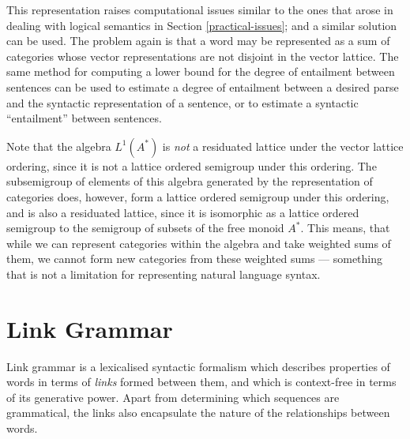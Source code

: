 This representation raises computational issues similar to the ones that arose in dealing with logical semantics in Section \ref{practical-issues}; and a similar solution can be used. The problem again is that a word may be represented as a sum of categories whose vector representations are not disjoint in the vector lattice. The same method for computing a lower bound for the degree of entailment between sentences can be used to estimate a degree of entailment between a desired parse and the syntactic representation of a sentence, or  to estimate a syntactic ``entailment'' between sentences.

Note that the algebra $L^1(A^*)$ is \emph{not} a residuated lattice under the vector lattice ordering, since it is not a lattice ordered semigroup under this ordering. The subsemigroup of elements of this algebra generated by the representation of categories does, however, form a lattice ordered semigroup under this ordering, and is also a residuated lattice, since it is isomorphic as a lattice ordered semigroup to the semigroup of subsets of the free monoid $A^*$. This means, that while we can represent categories within the algebra and take weighted sums of them, we cannot form new categories from these weighted sums --- something that is not a limitation for representing natural language syntax.



\section{Link Grammar}
\label{link-grammar-section}

Link grammar \citep{Sleator:91} is a lexicalised syntactic formalism which describes properties of words in terms of \emph{links} formed between them, and which is context-free in terms of its generative power. Apart from determining which sequences are grammatical, the links also encapsulate the nature of the relationships between words.

